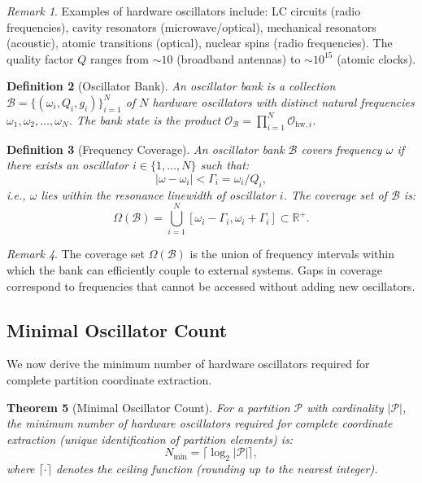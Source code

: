 \documentclass[twocolumn,10pt,a4paper]{article}
\newtheorem{theorem}{Theorem}[section]
\newtheorem{definition}[theorem]{Definition}
\theoremstyle{remark}
\newtheorem{remark}[theorem]{Remark}
\newcommand{\partition}{\mathcal{P}}
\newcommand{\oscillator}{\mathcal{O}}
\newcommand{\Reals}{\mathbb{R}}
\begin{document}
\begin{remark}
Examples of hardware oscillators include: LC circuits (radio frequencies), cavity resonators (microwave/optical), mechanical resonators (acoustic), atomic transitions (optical), nuclear spins (radio frequencies). The quality factor $Q$ ranges from $\sim 10$ (broadband antennas) to $\sim 10^{15}$ (atomic clocks).
\end{remark}

\begin{definition}[Oscillator Bank]
\label{def:oscillator_bank}
An \emph{oscillator bank} is a collection $\mathcal{B} = \{(\omega_i, Q_i, g_i)\}_{i=1}^N$ of $N$ hardware oscillators with distinct natural frequencies $\omega_1, \omega_2, \ldots, \omega_N$. The bank state is the product $\oscillator_{\mathcal{B}} = \prod_{i=1}^N \oscillator_{\text{hw},i}$.
\end{definition}

\begin{definition}[Frequency Coverage]
\label{def:frequency_coverage}
An oscillator bank $\mathcal{B}$ \emph{covers} frequency $\omega$ if there exists an oscillator $i \in \{1, \ldots, N\}$ such that:
\begin{equation}
|\omega - \omega_i| < \Gamma_i = \omega_i / Q_i,
\end{equation}
i.e., $\omega$ lies within the resonance linewidth of oscillator $i$. The \emph{coverage set} of $\mathcal{B}$ is:
\begin{equation}
\Omega(\mathcal{B}) = \bigcup_{i=1}^N [\omega_i - \Gamma_i, \omega_i + \Gamma_i] \subset \Reals^+.
\end{equation}
\end{definition}

\begin{remark}
The coverage set $\Omega(\mathcal{B})$ is the union of frequency intervals within which the bank can efficiently couple to external systems. Gaps in coverage correspond to frequencies that cannot be accessed without adding new oscillators.
\end{remark}

\subsection{Minimal Oscillator Count}

We now derive the minimum number of hardware oscillators required for complete partition coordinate extraction.

\begin{theorem}[Minimal Oscillator Count]
\label{thm:minimal_hardware}
For a partition $\partition$ with cardinality $|\partition|$, the minimum number of hardware oscillators required for complete coordinate extraction (unique identification of partition elements) is:
\begin{equation}
N_{\min} = \lceil \log_2 |\partition| \rceil,
\end{equation}
where $\lceil \cdot \rceil$ denotes the ceiling function (rounding up to the nearest integer).
\end{theorem}
\end{document}
